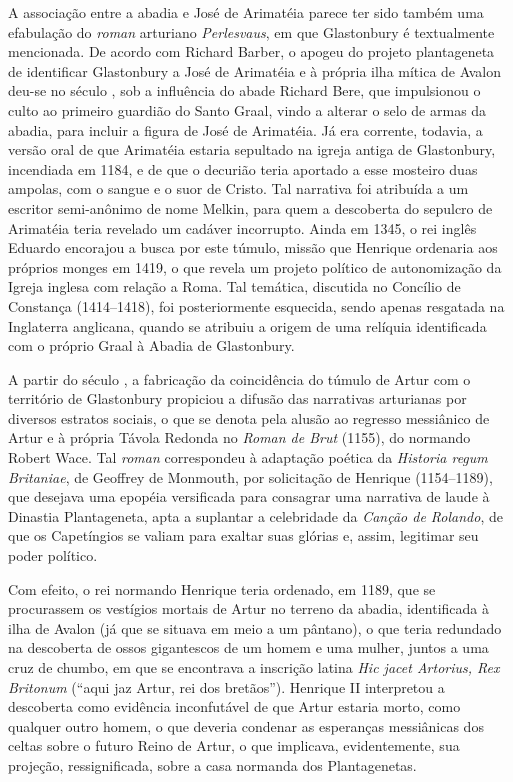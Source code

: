 A associação entre a abadia e José de Arimatéia parece ter sido também uma
efabulação do \textit{roman} arturiano \textit{Perlesvaus}, em que Glastonbury
é textualmente mencionada. De acordo com Richard Barber, o apogeu do projeto
plantageneta de identificar Glastonbury a José de Arimatéia e à própria ilha
mítica de Avalon deu-se no século , sob a influência do abade Richard Bere,
que impulsionou o culto ao primeiro guardião do Santo Graal, vindo a alterar o
selo de armas da abadia, para incluir a figura de José de Arimatéia. Já era
corrente, todavia, a versão oral de que Arimatéia estaria sepultado na igreja
antiga de Glastonbury, incendiada em 1184, e de que o decurião teria aportado a
esse mosteiro duas ampolas, com o sangue e o suor de Cristo. Tal narrativa foi
atribuída a um escritor semi-anônimo de nome Melkin, para quem a descoberta do
sepulcro de Arimatéia teria revelado um cadáver incorrupto. Ainda em 1345, o
rei inglês Eduardo  encorajou a busca por este túmulo, missão que Henrique 
ordenaria aos próprios monges em 1419, o que revela um projeto político de
autonomização da Igreja inglesa com relação a Roma. Tal temática, discutida no
Concílio de Constança (1414--1418), foi posteriormente esquecida, sendo apenas
resgatada na Inglaterra anglicana, quando se atribuiu a origem de uma relíquia
identificada com o próprio Graal à Abadia de Glastonbury.

A partir do século , a fabricação da coincidência do túmulo de Artur com o
território de Glastonbury propiciou a difusão das narrativas arturianas por
diversos estratos sociais, o que se denota pela alusão ao regresso messiânico
de Artur e à própria Távola Redonda no \textit{Roman de Brut} (1155), do
normando Robert Wace. Tal \textit{roman }correspondeu à adaptação poética da
\textit{Historia regum Britaniae}, de Geoffrey de Monmouth, por solicitação de
Henrique  (1154--1189), que desejava uma epopéia versificada para consagrar
uma narrativa de laude à Dinastia Plantageneta, apta a suplantar a celebridade
da \textit{Canção de Rolando}, de que os Capetíngios se valiam para exaltar
suas glórias e, assim, legitimar seu poder político. 

Com efeito, o rei normando Henrique  teria ordenado, em 1189, que se
procurassem os vestígios mortais de Artur no terreno da abadia, identificada à
ilha de Avalon (já que se situava em meio a um pântano), o que teria redundado
na descoberta de ossos gigantescos de um homem e uma mulher, juntos a uma cruz
de chumbo, em que se encontrava a inscrição latina \textit{Hic jacet Artorius,
Rex Britonum} (“aqui jaz Artur, rei dos bretãos”). Henrique II interpretou a
descoberta como evidência inconfutável de que Artur estaria morto, como
qualquer outro homem, o que deveria condenar as esperanças messiânicas dos
celtas sobre o futuro Reino de Artur, o que implicava, evidentemente, sua
projeção, ressignificada, sobre a casa normanda dos Plantagenetas.

